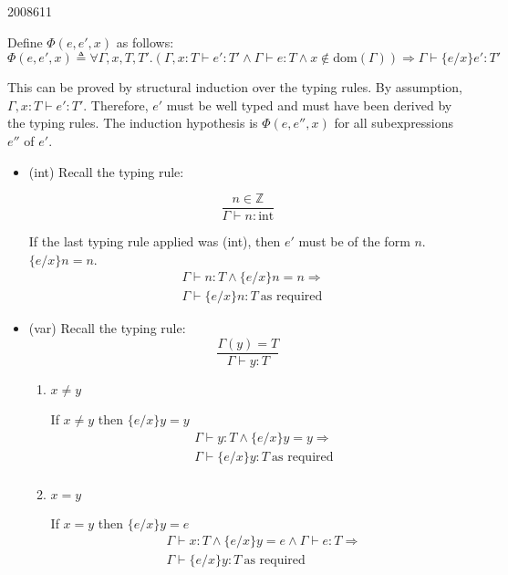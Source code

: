 \documentclass[10pt,\jkfside,a4paper]{article}
\begin{document}
\begin{examquestion}{2008}{6}{11}
\begin{enumerate}[label=(\alph*)]
Define $\Phi(e, e', x)$ as follows:
\[
\Phi(e, e', x) \triangleq
\forall \Gamma, x, T, T'.
\left(\Gamma, x: T \vdash e': T' \wedge \Gamma \vdash e:
T \wedge x \notin \text{dom}(\Gamma)\right) \Longrightarrow \Gamma \vdash
 \{e/x\}e': T'
\]

This can be proved by structural induction over the typing rules. By
assumption, $\Gamma, x:T \vdash e': T'$. Therefore, $e'$ must be well typed
and must have been derived by the typing rules. The induction hypothesis is
$\Phi(e, e'', x)$ for all subexpressions $e''$ of $e'$.

\begin{itemize}[label=\textbf{Case}]

\item (int) Recall the typing rule:

\[
\dfrac{n \in \mathbb{Z}}{\Gamma \vdash n: \text{int}}
\]

If the last typing rule applied was (int), then $e'$ must be of the form
$n$. $\{e/x\}n = n$.
\[
\begin{split}
&\Gamma \vdash n : T \wedge \{e/x\}n = n \Longrightarrow \\
&\Gamma \vdash \{e/x\}n : T \ \text{as required}
\end{split}
\]

\item (var) Recall the typing rule:
\[
\dfrac{
\Gamma(y) = T
}{
\Gamma \vdash y: T
}
\]

\begin{enumerate}[label=\textbf{case}]

\item $x \neq y$

If $x \neq y$ then $\{e/x\}y = y$
\[
\begin{split}
&\Gamma \vdash y: T \wedge \{e/x\}y = y \Longrightarrow \\
&\Gamma \vdash \{e/x\}y : T \ \text{as required} \\
\end{split}
\]

\item $x = y$

If $x = y$ then $\{e/x\}y = e$
\[
\begin{split}
&\Gamma \vdash x: T \wedge \{e/x\}y = e \wedge \Gamma \vdash e: T
\Longrightarrow \\
&\Gamma \vdash \{e/x\}y: T \ \text{as required}
\end{split}
\]

\end{enumerate}


\end{itemize}
\end{enumerate}
\end{examquestion}
\end{document}
